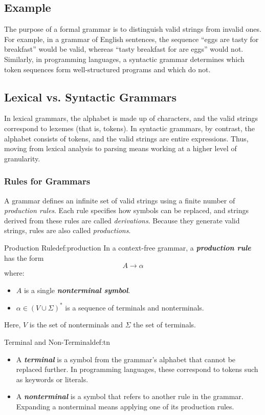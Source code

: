 \documentclass[12pt,a4paper]{article}
\newcommand{\bemph}[1]{\textbf{\emph{#1}}}
\begin{document}
\subsection*{Example}
The purpose of a formal grammar is to distinguish valid strings from invalid ones. For example, in a grammar of English sentences, the sequence ``eggs are tasty for breakfast'' would be valid, whereas ``tasty breakfast for are eggs'' would not. Similarly, in programming languages, a syntactic grammar determines which token sequences form well-structured programs and which do not.\subsection*{Lexical vs. Syntactic Grammars}
In lexical grammars, the alphabet is made up of characters, and the valid strings correspond to lexemes (that is, tokens). In syntactic grammars, by contrast, the alphabet consists of tokens, and the valid strings are entire expressions. Thus, moving from lexical analysis to parsing means working at a higher level of granularity.


\subsubsection{Rules for Grammars}

A grammar defines an infinite set of valid strings using a finite number of \emph{production rules}.
Each rule specifies how symbols can be replaced, and strings derived from these rules are called
\emph{derivations}. Because they generate valid strings, rules are also called \emph{productions}.

\begin{definition}{Production Rule}{def:production}\label{def:production}
	In a context-free grammar, a \bemph{production rule} has the form
	\[
		A \rightarrow \alpha
	\]
	where:
	\begin{itemize}
		\item \(A\) is a single \bemph{nonterminal symbol}.
		\item \(\alpha \in (V \cup \Sigma)^*\) is a sequence of terminals and nonterminals.
	\end{itemize}
	Here, \(V\) is the set of nonterminals and \(\Sigma\) the set of terminals.
\end{definition}

\begin{definition}{Terminal and Non-Terminal}{def:tn}\label{def:tn}
	\begin{itemize}
		\item A \bemph{terminal} is a symbol from the grammar’s alphabet that cannot be replaced further. In programming languages, these correspond to tokens such as keywords or literals.
		\item A \bemph{nonterminal} is a symbol that refers to another rule in the grammar. Expanding a nonterminal means applying one of its production rules.
	\end{itemize}
\end{definition}
\end{document}
